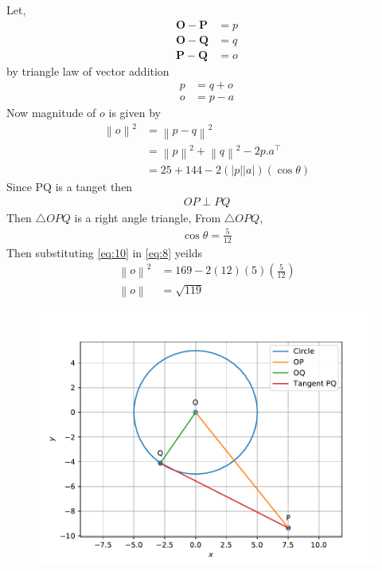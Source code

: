 \documentclass[12pt]{article}
\providecommand{\brak}[1]{\ensuremath{\left(#1\right)}}
\providecommand{\norm}[1]{\left\lVert#1\right\rVert}
\providecommand{\abs}[1]{\left\vert#1\right\vert}
\let\vec\mathbf
\begin{document}
\begin{enumerate}
Let,
		\begin{align}
			\vec{O}-\vec{P}&=p\\
			\vec{O}-\vec{Q}&=q\\
			\vec{P}-\vec{Q}&=o
		\end{align}
		by triangle law of vector addition
		\begin{align}
			p&=q+o\\
			o&=p-a
		\end{align}
		Now magnitude of $o$ is given by
		\begin{align}
		\norm{o}^2&=\norm{p-q}^2\\
	&=\norm{p}^2+\norm{q}^2-2p.a^\top\\
			&=25+144-2(\abs{p}\abs{a})(\cos{\theta}) \label{eq:8}
		\end{align}
		Since PQ is a tanget then
		\begin{align}
OP\perp PQ
		\end{align}
Then $\triangle OPQ$ is a right angle triangle, From $\triangle OPQ$,
		\begin{align}
			\cos{\theta}=\frac{5}{12}\label{eq:10}
		\end{align}
		Then substituting \eqref{eq:10} in \eqref{eq:8} yeilds
		\begin{align}
		\norm{o}^2&=169-2(12)(5)\brak{\frac{5}{12}}\\
		\norm{o}&=\sqrt{119}
		\end{align}
\begin{figure}[!h]
\begin{center}
\includegraphics[width=\columnwidth]{figs/fig1.pdf}
\end{center}
\caption{}
\label{fig:Fig1}
\end{figure}
\end{enumerate}
\end{document}
